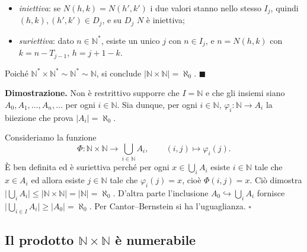 \documentclass[11pt,a4paper]{article}
\newcommand{\N}{\mathbb{N}}
\newcommand{\inj}{\hookrightarrow}
\theoremstyle{definition}
\theoremstyle{plain}
\theoremstyle{remark}
\begin{document}
\begin{itemize}
  \item \emph{iniettiva}: se $N(h,k)=N(h',k')$ i due valori stanno nello
        stesso $I_j$, quindi $(h,k),(h',k')\in D_j$, e su $D_j$ $N$ \`e iniettiva;
  \item \emph{suriettiva}: dato $n\in\mathbb{N}^*$, esiste un unico $j$ con
        $n\in I_j$, e $n=N(h,k)$ con $k=n-T_{j-1}$, $h=j+1-k$.
\end{itemize}
\noindent Poich\'e $\mathbb{N}^*\times\mathbb{N}^*\sim\mathbb{N}^*\sim\mathbb{N}$,
si conclude $|\mathbb{N}\times\mathbb{N}|=\aleph_0$.
\hfill$\blacksquare$

\textbf{Dimostrazione.} Non è restrittivo supporre che $I=\N$ e che gli insiemi siano $A_0,A_1,\dots,A_n,\dots$ per ogni $i\in\N$. Sia dunque, per ogni $i\in\N$, $\varphi_i\colon\N\to A_i$ la biiezione che prova $|A_i|=\aleph_0$.

Consideriamo la funzione
\[
\Phi\colon\N\times\N\longrightarrow\bigcup_{i\in\N}A_i,\qquad(i,j)\longmapsto\varphi_i(j).
\]
È ben definita ed è suriettiva perché per ogni $x\in\bigcup_{i}A_i$ esiste $i\in\N$ tale che $x\in A_i$ ed allora esiste $j\in\N$ tale che $\varphi_i(j)=x$, cioè $\Phi(i,j)=x$.
Ciò dimostra $\bigl|\bigcup_iA_i\bigr|\le|\N\times\N|=|\N|=\aleph_0$.
D'altra parte l'inclusione $A_0\inj\bigcup_iA_i$ fornisce $\bigl|\bigcup_{i\in I}A_i\bigr|\ge|A_0|=\aleph_0$. Per Cantor--Bernstein si ha l'uguaglianza. \hfill$\square$



\subsection{Il prodotto $\N\times\N$ è numerabile}
\end{document}
